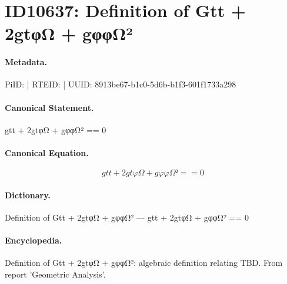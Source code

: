\section*{ID10637: Definition of Gtt + 2gtφΩ + gφφΩ²}
\paragraph{Metadata.}
PiID:  | RTEID:  | UUID: 8913be67-b1c0-5d6b-b1f3-601f1733a298

\paragraph{Canonical Statement.}
gtt + 2gtφΩ + gφφΩ² == 0

\paragraph{Canonical Equation.}
\[
gtt + 2gtφΩ + gφφΩ² == 0
\]

\paragraph{Dictionary.}
Definition of Gtt + 2gtφΩ + gφφΩ² — gtt + 2gtφΩ + gφφΩ² == 0

\paragraph{Encyclopedia.}
Definition of Gtt + 2gtφΩ + gφφΩ²: algebraic definition relating TBD. From report 'Geometric Analysis'.
